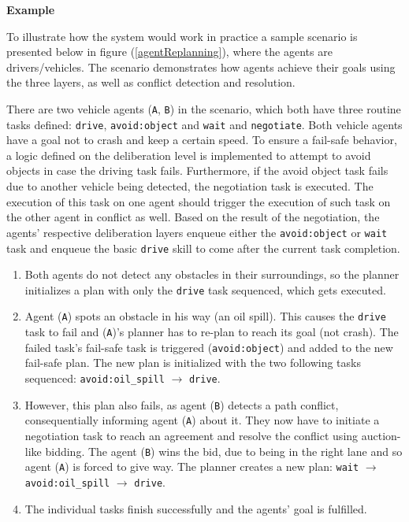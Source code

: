 \documentclass[main.tex]{subfiles}
\begin{document}
\textbf{Example}

To illustrate how the system would work in practice a sample scenario is presented below in
figure (\ref{agentReplanning}), where the agents are drivers/vehicles. The scenario demonstrates 
how agents achieve their goals using the three layers, as well as conflict detection and resolution.

There are two vehicle agents (\texttt{A}, \texttt{B}) in the scenario, which both have three routine tasks defined:
\texttt{drive}, \texttt{avoid:object} and \texttt{wait} and \texttt{negotiate}. Both vehicle
agents have a goal not to crash and keep a certain speed. To ensure a fail-safe behavior, 
a logic defined on the deliberation level is implemented to attempt to avoid objects in case the driving task
fails. Furthermore, if the avoid object task fails due to another vehicle being detected, the negotiation 
task is executed. The execution of this task on one agent should trigger the execution of such task on the 
other agent in conflict as well. Based on the result of the negotiation, the agents' respective 
deliberation layers enqueue either the \texttt{avoid:object} or \texttt{wait} task and enqueue the 
basic \texttt{drive} skill to come after the current task completion.

\begin{enumerate}
    \item Both agents do not detect any obstacles in their surroundings, so the planner
    initializes a plan with only the \texttt{drive} task sequenced, which gets executed. 

    \item Agent (\texttt{A}) spots an obstacle in his way (an oil spill). This causes the
    \texttt{drive} task to fail and (\texttt{A})'s planner has to re-plan to reach its goal (not
    crash). The failed task's fail-safe task is triggered (\texttt{avoid:object})
    and added to the new fail-safe plan. The new plan is initialized with the two
    following tasks sequenced: \texttt{avoid:oil\_spill} $\rightarrow$ \texttt{drive}.
    
    \item However, this plan also fails, as agent (\texttt{B}) detects a path conflict, consequentially 
    informing agent (\texttt{A}) about it. They now have to initiate a negotiation task to reach an agreement and
    resolve the conflict using auction-like bidding. The agent (\texttt{B}) wins the bid, due
    to being in the right lane and so agent (\texttt{A}) is forced to give way. The planner
    creates a new plan: \texttt{wait} $\rightarrow$ \texttt{avoid:oil\_spill} $\rightarrow$
    \texttt{drive}.
    
    \item The individual tasks finish successfully and the agents' goal is fulfilled.
\end{enumerate}
\end{document}
